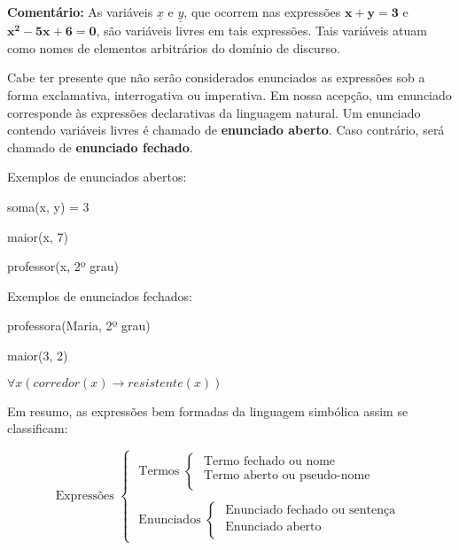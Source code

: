 \noindent \textbf{Comentário:} As variáveis $\underline{x}$ e $\underline{y}$, que ocorrem nas expressões $\bm{x + y = 3}$ e $\bm{x^2 - 5x + 6 = 0}$, são variáveis livres em tais expressões.
Tais variáveis atuam como nomes de elementos arbitrários do domínio de discurso.

\noindent
Cabe ter presente que não serão considerados enunciados as expressões sob a forma exclamativa, interrogativa ou imperativa.
Em nossa acepção, um enunciado corresponde às expressões declarativas da linguagem natural.
Um enunciado contendo variáveis livres é chamado de \textbf{enunciado aberto}.
Caso contrário, será chamado de \textbf{enunciado fechado}.

\bigskip

\noindent
Exemplos de enunciados abertos:

\hskip 2.5cm soma(x, y) = 3

\hskip 2.5cm maior(x, 7)

\hskip 2.5cm professor(x, 2º grau)

\bigskip

\noindent
Exemplos de enunciados fechados:

\hskip 2.5cm professora(Maria, 2º grau)

\hskip 2.5cm maior(3, 2)

\hskip 2.5cm $\forall x(corredor(x) \to resistente(x))$

\bigskip

Em resumo, as expressões bem formadas da linguagem simbólica assim se classificam:

\[
    \text{Expressões }
    \begin{cases}
        \text{ Termos }
        \begin{cases}
            \text{ Termo fechado ou nome }\\
            \text{ Termo aberto ou pseudo-nome}\\
        \end{cases}

        \\
        \\

        \text{ Enunciados }
        \begin{cases}
            \text{ Enunciado fechado ou sentença}\\
            \text{ Enunciado aberto}\\
        \end{cases}
    \end{cases}
\]

